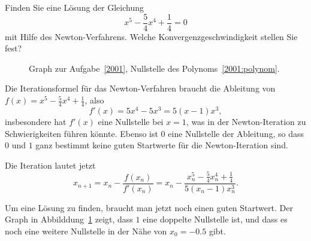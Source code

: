 Finden Sie eine Lösung der Gleichung
\begin{equation}
x^5 - \frac54x^4 +\frac14 = 0
\label{2001:polynom}
\end{equation}
mit Hilfe des Newton-Verfahrens.
%
Welche Konvergenzgeschwindigkeit stellen Sie fest?
%

\begin{loesung}
\begin{figure}
\centering
\def\skala{4}
\caption{Graph zur Aufgabe~\ref{2001}, Nullstelle des
Polynoms~\eqref{2001:polynom}.
\label{2001:figure}}
\end{figure}
Die Iterationsformel für das Newton-Verfahren braucht die Ableitung von
$f(x)=x^5-\frac54x^4+\frac14$, also
\[
f'(x)= 5x^4-5x^3 = 5(x-1)x^3,
\]
insbesondere hat $f'(x)$ eine Nullstelle bei $x=1$, was in der Newton-Iteration
zu Schwierigkeiten führen könnte.
%
%
Ebenso ist $0$ eine Nullstelle der Ableitung, so dass $0$ und $1$ ganz
bestimmt keine guten Startwerte für die Newton-Iteration sind.

Die Iteration lautet jetzt
\[
x_{n+1} = x_n - \frac{f(x_n)}{f'(x_n)}
=
x_n -\frac{x_n^5-\frac54x_n^4+\frac14}{5(x_n-1)x_n^3}.
\]

Um eine Lösung zu finden, braucht man jetzt noch einen guten Startwert.
Der Graph in Abbilddung~\ref{2001:figure} zeigt, dass $1$ eine doppelte
Nullstelle ist, und dass es noch eine weitere Nullstelle in der Nähe von
$x_0=-0.5$ gibt.


\end{loesung}
